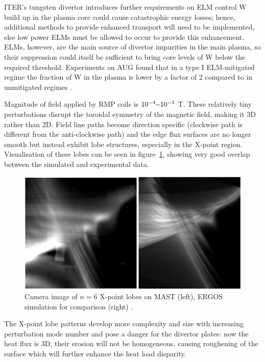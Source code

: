 \documentclass[12pt]{article}  %
\providecommand{\squiggle}{\raise.17ex\hbox{$\scriptstyle\sim$}} %
\begin{document}
ITER's tungsten divertor introduces further requirements on ELM control\cite{KirkFF} W build up in the plasma core could cause catastrophic energy losses; hence, additional methods to provide enhanced transport will need to be implemented, else low power ELMs must be allowed to occur to provide this enhancement. ELMs, however, are the main source of divertor impurities in the main plasma, so their suppression could itself be sufficient to bring core levels of W below the required threshold. Experiments on AUG found that in a type I ELM-mitigated regime the fraction of W in the plasma is lower by a factor of 2 compared to in unmitigated regimes \cite{Suttrop2011}.

Magnitude of field applied by RMP coils is $10^{-4} \squiggle 10^{-3}$ T\cite{Evans2015}. These relatively tiny perturbations disrupt the toroidal symmetry of the magnetic field, making it 3D rather than 2D. Field line paths become direction specific (clockwise path is different from the anti-clockwise path) and the edge flux surfaces are no longer smooth but instead exhibit lobe structures, especially in the X-point region. Visualisation of these lobes can be seen in figure~\ref{fig:lobes}, showing very good overlap between the simulated and experimental data.

\begin{figure}
\includegraphics[scale=0.5]{Figures/lobes.png}
\centering
\caption{Camera image of $n=6$ X-point lobes on MAST (left), ERGOS simulation for comparison (right) \cite{Harrison2014}.}\label{fig:lobes}
\end{figure}

The X-point lobe patterns develop more complexity and size with increasing perturbation mode number \cite{Harrison2014} and pose a danger for the divertor plates: now the heat flux is 3D, their erosion will not be homogeneous, causing roughening of the surface which will further enhance the heat load disparity.
\end{document}

